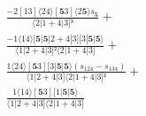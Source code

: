 \documentclass[varwidth, border=5pt]{standalone}
\begin{document}
\begin{my}
$\begin{gathered}
\scriptscriptstyle\frac{-2[13]⟨24⟩[𝟓3]⟨2𝟓⟩s_{𝟓}}{⟨2|1+4|3]³} +\\
\scriptscriptstyle\frac{-1⟨14⟩[𝟓|𝟓|2+4|3][3|𝟓|𝟓⟩}{⟨1|2+4|3]²⟨2|1+4|3]} +\\
\scriptscriptstyle\frac{1⟨24⟩[𝟓3][3|𝟓|𝟓⟩(s_{124}-s_{134})}{⟨1|2+4|3]⟨2|1+4|3]²} +\\
\scriptscriptstyle\frac{1⟨14⟩[𝟓3][1|𝟓|𝟓⟩}{⟨1|2+4|3]⟨2|1+4|3]} \phantom{+}
\end{gathered}$
\end{my}
\end{document}
